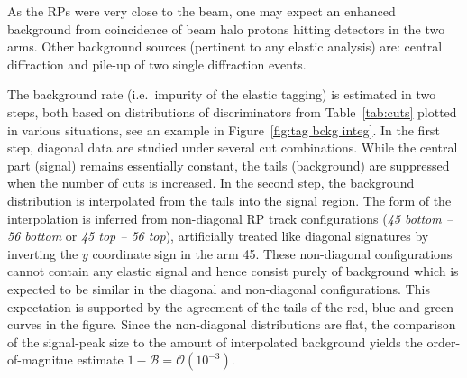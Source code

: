 As the RPs were very close to the beam, one may expect an enhanced background from coincidence of beam halo protons hitting detectors in the two arms. Other background sources (pertinent to any elastic analysis) are: central diffraction and pile-up of two single diffraction events.

The background rate (i.e.~impurity of the elastic tagging) is estimated in two steps, both based on distributions of discriminators from Table~\ref{tab:cuts} plotted in various situations, see an example in Figure~\ref{fig:tag bckg integ}. In the first step, diagonal data are studied under several cut combinations. While the central part (signal) remains essentially constant, the tails (background) are suppressed when the number of cuts is increased. In the second step, the background distribution is interpolated from the tails into the signal region. The form of the interpolation is inferred from non-diagonal RP track configurations (\textit{45 bottom -- 56 bottom} or \textit{45 top -- 56 top}), artificially treated like diagonal signatures by inverting the $y$ coordinate sign in the arm 45. These non-diagonal configurations cannot contain any elastic signal and hence consist purely of background which is expected to be similar in the diagonal and non-diagonal configurations. This expectation is supported by the agreement of the tails of the red, blue and green curves in the figure. Since the non-diagonal distributions are flat, the comparison of the signal-peak size to the amount of interpolated background yields the order-of-magnitue estimate $1 - \mathcal{B} = \mathcal{O}(10^{-3})$.

